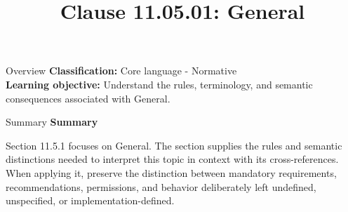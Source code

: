 \documentclass[10pt,letterpaper]{article}
\title{Clause 11.05.01: General}
\author{}
\date{}
\begin{document}
\maketitle
\begin{CornellOverviewBox}{Overview}
\textbf{Classification:} Core language - Normative\\[2pt]
\textbf{Learning objective:} Understand the rules, terminology, and semantic consequences associated with General.
\end{CornellOverviewBox}\begin{CornellSummaryBox}{Summary}
{\sffamily\bfseries\color{Accent} Summary}\par\vspace{3pt}Section 11.5.1 focuses on General. The section supplies the rules and semantic distinctions needed to interpret this topic in context with its cross-references. When applying it, preserve the distinction between mandatory requirements, recommendations, permissions, and behavior deliberately left undefined, unspecified, or implementation-defined.
\end{CornellSummaryBox}
\end{document}
